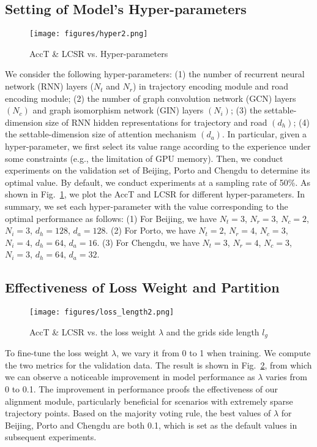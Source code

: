 \subsection{Setting of Model's Hyper-parameters}
\begin{figure}
  \centering  
  \texttt{[image: figures/hyper2.png]}
  \vspace{-0.15in}
  \caption{AccT \& LCSR vs. Hyper-parameters}
  \vspace{-0.15in}
  \label{fig:hype}
\end{figure}
We consider the following hyper-parameters: (1) the number of recurrent neural network (RNN) layers ($N_t$ and $N_r$) in trajectory encoding module and road encoding module; (2) the number of graph convolution network (GCN) layers $(N_c)$ and graph isomorphism network (GIN) layers $(N_i)$; (3) the settable-dimension size of RNN hidden representations for trajectory and road $(d_h)$; (4) the settable-dimension size of attention mechanism $(d_a)$. In particular, given a hyper-parameter, we first select its value range according to the experience under some constraints (e.g., the limitation of GPU memory). Then, we conduct experiments on the validation set of Beijing, Porto and Chengdu to determine its optimal value. By default, we conduct experiments at a sampling rate of 50\%. As shown in Fig.~\ref{fig:hype}, we plot the AccT and LCSR for different hyper-parameters. In summary, we set each hyper-parameter with the value corresponding to the optimal performance as follows: (1) For Beijing, we have $N_t = 3$, $N_r = 3$, $N_c = 2$, $N_i = 3$, $d_h = 128$, $d_a = 128$. (2) For Porto, we have $N_t = 2$, $N_r = 4$, $N_c = 3$, $N_i = 4$, $d_h = 64$, $d_a = 16$. (3) For Chengdu, we have $N_t = 3$, $N_r = 4$, $N_c = 3$, $N_i = 3$, $d_h = 64$, $d_a = 32$.

\subsection{Effectiveness of Loss Weight and Partition}
\label{sec:6.3}
\begin{figure}
  \centering  
  \texttt{[image: figures/loss\_length2.png]}
  \vspace{-0.15in}
  \caption{AccT \& LCSR vs. the loss weight $\lambda$ and the grids side length $l_g$}
  \vspace{-0.15in}
  \label{fig:loss&length}
\end{figure}

To fine-tune the loss weight $\lambda$, we vary it from 0 to 1 when training. We compute the two metrics for the validation data. The result is shown in Fig.~\ref{fig:loss&length}, from which we can observe a noticeable improvement in model performance as $\lambda$ varies from 0 to 0.1. The improvement in performance proofs the effectiveness of our alignment module, particularly beneficial for scenarios with extremely sparse trajectory points. Based on the majority voting rule, the best values of $\lambda$ for Beijing, Porto and Chengdu are both 0.1, which is set as the default values in subsequent experiments.

